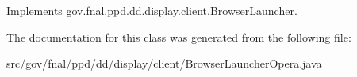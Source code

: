 Implements \hyperlink{classgov_1_1fnal_1_1ppd_1_1dd_1_1display_1_1client_1_1BrowserLauncher_a09da69929d79dc20075d5be2572f361c}{gov.\-fnal.\-ppd.\-dd.\-display.\-client.\-Browser\-Launcher}.



The documentation for this class was generated from the following file\-:\begin{DoxyCompactItemize}
\item 
src/gov/fnal/ppd/dd/display/client/Browser\-Launcher\-Opera.\-java\end{DoxyCompactItemize}
